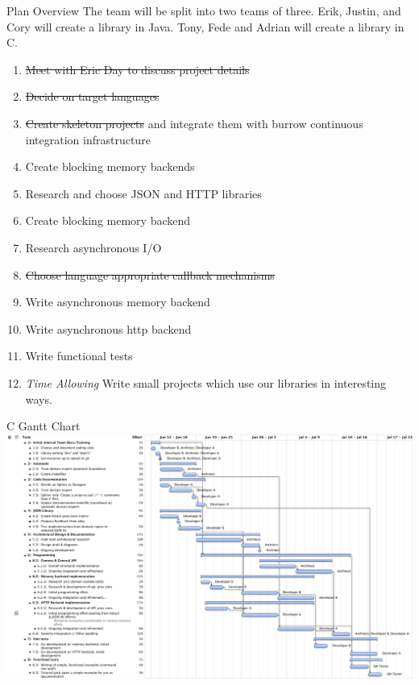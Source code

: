 \documentclass{beamer}
\begin{document}
\begin{frame}{Plan Overview}
  The team will be split into two teams of three.
  Erik, Justin, and Cory will create a library in Java.
  Tony, Fede and Adrian will create a library in C.

  \begin{enumerate}
  \item \sout{Meet with Eric Day to discuss project details}
  \item \sout{Decide on target languages}
  \item \sout{Create skeleton projects} and integrate them with burrow continuous integration infrastructure
  \item Create blocking memory backends
  \item Research and choose JSON and HTTP libraries
  \item Create blocking memory backend 
  \item Research asynchronous I/O
  \item \sout{Choose language appropriate callback mechanisms}
  \item Write asynchronous memory backend
  \item Write asynchronous http backend
  \item Write functional tests
  \item \textit{Time Allowing} Write small projects which use our libraries in interesting ways.
  \end{enumerate}
\end{frame}

\begin{frame}{C Gantt Chart}
  \includegraphics{C-Gantt.pdf}
\end{frame}
\end{document}
